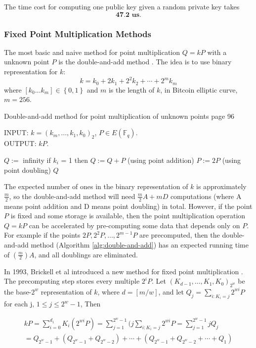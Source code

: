 The time cost for computing one public key given a random private key takes 
$$\textbf{47.2 us}. $$
\subsubsection{Fixed Point Multiplication Methods}
The most basic and naive method for point multiplication $Q=kP$ with a unknown point $P$ is the double-and-add method \cite{hankerson2006guide}.  The idea is to use binary representation for $k$:
$$ k = k_0 + 2k_1 + 2^2k_2+\cdots+2^mk_m$$
where $[k_0\dots k_m]\in \left\lbrace 0,1 \right\rbrace  $ and $m$ is the length of $k$, in Bitcoin elliptic curve, $m = 256$. 

 \begin{algorithm}[H] 
 	\caption{Double-and-add method for point multiplication of unknown points \cite{hankerson2006guide} page 96}
 	\label{alg:double-and-add}
 	INPUT: $k = (k_{m},...,k_1,k_0)_2$, $P \in E(\mathbb{F}_q)$. \\
 	OUTPUT: $kP$.
 	\begin{algorithmic} [1]
 		\STATE $Q := $ infinity
 		\STATE if $k_i$ = 1 then $Q := Q+P$  (using point addition)
 		\STATE $P:= 2P$ (using point doubling)
 		\ENDFOR
 		\RETURN $Q$
 	\end{algorithmic}
 \end{algorithm}

The expected number of ones in the binary representation of $k$ is approximately $\frac{m}{2}$, so the double-and-add method will need $\frac{m}{2}A + mD$ computations (where A means point addition and D means point doubling) in total. However, if the point $P$ is fixed and some storage is available, then the point multiplication operation $Q=kP$ can be accelerated by pre-computing some data that depends only on $P$. For example if the points $2P, 2^2P, \dots, 2^{m-1}P$ are precomputed, then the double-and-add method (Algorithm \ref{alg:double-and-add}) has an expected running time of $(\frac{m}{2})A$, and all doublings are eliminated.

In 1993, Brickell et al introduced a new method for fixed point multiplication \cite{brickell1993fast} . The precomputing step stores every multiple $2^iP$. Let $(K_{d-1},\dots,K_1,K_0)_{2^w}$ be the base-$2^w$ representation of $k$, where $d = [m/w]$, and let $Q_j = \sum_{i:K_i=j}2^{wi}P$ for each j, $1 \leq j \leq 2^w-1$, Then 
\begin{small}
\begin{multline} 
kP = \sum_{i=0}^{d_1}K_i(2^{wi}P) = \sum_{j=1}^{2^w-1}(j\sum_{i:K_i=j}2^{wi}P = \sum_{j=1}^{2^w-1}jQ_j\\
= Q_{2^w-1}+(Q_{2^w-1}+Q_{2^w-2})+\cdots+(Q_{2^w-1}+Q_{2^w-2}+\cdots+Q_1)
\end{multline}
\end{small}

